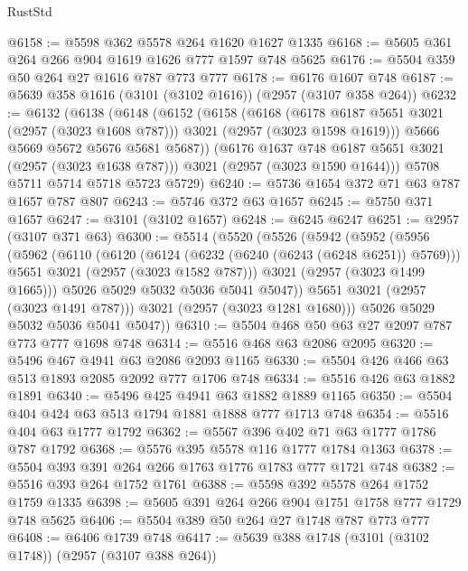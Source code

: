\begin{lexlean}{RustStd}
\begin{coremodule}
@6158 := @5598 @362 @5578 @264 @1620 @1627 @1335
@6168 := @5605 @361 @264 @266 @904 @1619 @1626 @777 @1597 @748 @5625
@6176 := @5504 @359 @50 @264 @27 @1616 @787 @773 @777
@6178 := @6176 @1607 @748
@6187 := @5639 @358 @1616 (@3101 (@3102 @1616)) (@2957 (@3107 @358 @264))
@6232 := @6132
    (@6138
      (@6148
        (@6152
          (@6158
            (@6168
              (@6178 @6187 @5651 @3021 (@2957 (@3023 @1608 @787)))
              @3021
              (@2957 (@3023 @1598 @1619)))
            @5666
            @5669
            @5672
            @5676
            @5681
            @5687))
        (@6176 @1637 @748 @6187 @5651 @3021 (@2957 (@3023 @1638 @787)))
        @3021
        (@2957 (@3023 @1590 @1644)))
      @5708
      @5711
      @5714
      @5718
      @5723
      @5729)
@6240 := @5736 @1654 @372 @71 @63 @787 @1657 @787 @807
@6243 := @5746 @372 @63 @1657
@6245 := @5750 @371 @1657
@6247 := @3101 (@3102 @1657)
@6248 := @6245 @6247
@6251 := @2957 (@3107 @371 @63)
@6300 := @5514
    (@5520
      (@5526
        (@5942
          (@5952
            (@5956
              (@5962
                (@6110
                  (@6120
                    (@6124 (@6232 (@6240 (@6243 (@6248 @6251)) @5769)))
                    @5651
                    @3021
                    (@2957 (@3023 @1582 @787)))
                  @3021
                  (@2957 (@3023 @1499 @1665)))
                @5026
                @5029
                @5032
                @5036
                @5041
                @5047))
            @5651
            @3021
            (@2957 (@3023 @1491 @787)))
          @3021
          (@2957 (@3023 @1281 @1680)))
        @5026
        @5029
        @5032
        @5036
        @5041
        @5047))
@6310 := @5504 @468 @50 @63 @27 @2097 @787 @773 @777 @1698 @748
@6314 := @5516 @468 @63 @2086 @2095
@6320 := @5496 @467 @4941 @63 @2086 @2093 @1165
@6330 := @5504 @426 @466 @63 @513 @1893 @2085 @2092 @777 @1706 @748
@6334 := @5516 @426 @63 @1882 @1891
@6340 := @5496 @425 @4941 @63 @1882 @1889 @1165
@6350 := @5504 @404 @424 @63 @513 @1794 @1881 @1888 @777 @1713 @748
@6354 := @5516 @404 @63 @1777 @1792
@6362 := @5567 @396 @402 @71 @63 @1777 @1786 @787 @1792
@6368 := @5576 @395 @5578 @116 @1777 @1784 @1363
@6378 := @5504 @393 @391 @264 @266 @1763 @1776 @1783 @777 @1721 @748
@6382 := @5516 @393 @264 @1752 @1761
@6388 := @5598 @392 @5578 @264 @1752 @1759 @1335
@6398 := @5605 @391 @264 @266 @904 @1751 @1758 @777 @1729 @748 @5625
@6406 := @5504 @389 @50 @264 @27 @1748 @787 @773 @777
@6408 := @6406 @1739 @748
@6417 := @5639 @388 @1748 (@3101 (@3102 @1748)) (@2957 (@3107 @388 @264))

\end{coremodule}
\end{lexlean}
